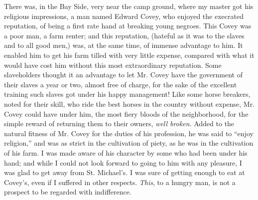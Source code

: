 There was, in the Bay Side, very near the camp ground, where my master
got his religious impressions, a man named Edward Covey, who enjoyed the
execrated reputation, of being a first rate hand at breaking young
negroes. This Covey was a poor man, a farm renter; and this reputation,
(hateful as it was to the slaves and to all good men,) was, at the same
time, of immense advantage to him. It enabled him to get his farm tilled
with very little expense, compared with what it would have cost him
without this most extraordinary reputation. Some slaveholders thought it
an advantage to let Mr. Covey have the government of their slaves a year
or two, almost free of charge, for the sake of the excellent training
such slaves got under his happy management! Like some horse breakers,
noted for their skill, who ride the best horses in the country without
expense, Mr. Covey could have under him, the most fiery bloods of the
neighborhood, for the simple reward of returning them to their owners,
\emph{well broken}. Added to the natural fitness of Mr. Covey for the
duties of his profession, he was said to ``enjoy religion,''
{\protect\hypertarget{204}{}{}}and was as strict in the cultivation of
piety, as he was in the cultivation of his farm. I was made aware of his
character by some who had been under his hand; and while I could not
look forward to going to him with any pleasure, I was glad to get away
from St. Michael's. I was sure of getting enough to eat at Covey's, even
if I suffered in other respects. \emph{This}, to a hungry man, is not a
prospect to be regarded with indifference.
